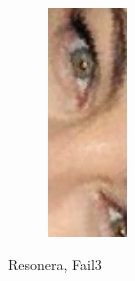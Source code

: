 \begin{figure}[H]
\begin{subfigure}{.25\textwidth}
  \caption{}
\end{subfigure}%
\begin{subfigure}{.25\textwidth}
  \centering
  \includegraphics[width=0.23\textwidth]{img/fd3/fail3_output.png}
  \caption{}
\end{subfigure}%

\caption{Resonera, Fail3}
\label{fig:fail3}
\end{figure}




